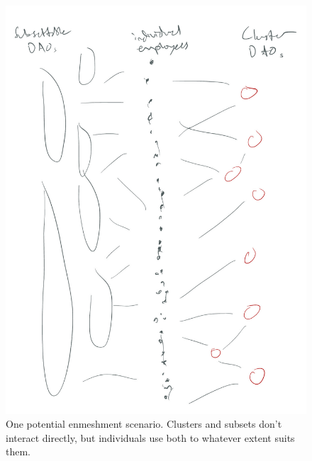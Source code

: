 \documentclass{article}[10pt]
\begin{document}
\begin{figure}[!ht]
    \centering
    \includegraphics[width=\textwidth]{figures/IMG_1011.pdf}
    \caption{One potential enmeshment scenario. Clusters and subsets don't interact directly, but individuals use both to whatever extent suits them.}
    \label{fig:indirectEnmeshment}
\end{figure}
\end{document}
